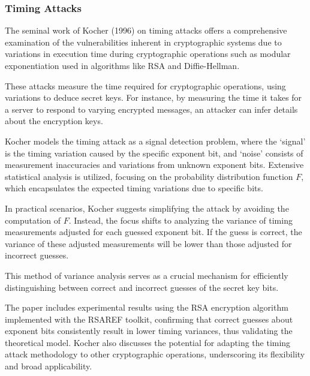 \subsubsection{Timing Attacks}

The seminal work of Kocher (1996)\cite{kocherTimingAttacksImplementations1996} on timing attacks offers a comprehensive examination of the vulnerabilities 
inherent in cryptographic systems due to variations in execution time during cryptographic operations such as modular exponentiation used in algorithms 
like RSA and Diffie-Hellman.

These attacks measure the time required for cryptographic operations,
using variations to deduce secret keys. For instance, by measuring the
time it takes for a server to respond to varying encrypted messages, an
attacker can infer details about the encryption keys.

Kocher models the timing attack as a signal detection problem, where the `signal' is the timing variation caused by the specific exponent bit, and `noise' consists of measurement inaccuracies and variations from unknown exponent bits. Extensive statistical analysis is utilized, focusing on the probability distribution function \( F \), which encapsulates the expected timing variations due to specific bits.

In practical scenarios, Kocher suggests simplifying the attack by avoiding the computation of \( F \). Instead, the focus shifts to analyzing the variance of timing measurements adjusted for each guessed exponent bit. If the guess is correct, the variance of these adjusted measurements will be lower than those adjusted for incorrect guesses.

This method of variance analysis serves as a crucial mechanism for efficiently distinguishing between correct and incorrect guesses of the secret key bits.

The paper includes experimental results using the RSA encryption algorithm implemented with the RSAREF toolkit, confirming that correct guesses about exponent bits consistently result in lower timing variances, thus validating the theoretical model. Kocher also discusses the potential for adapting the timing attack methodology to other cryptographic operations, underscoring its flexibility and broad applicability.\\

